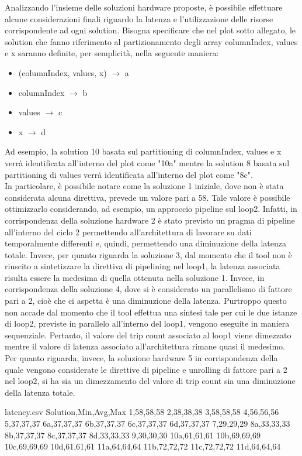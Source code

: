 Analizzando l'insieme delle soluzioni hardware proposte, è possibile effettuare alcune considerazioni finali riguardo la latenza e l'utilizzazione delle risorse corrispondente ad ogni solution. Bisogna specificare che nel plot sotto allegato, le solution che fanno riferimento al partizionamento degli array columnIndex, values e x saranno definite, per semplicità, nella seguente maniera:
\begin{itemize}
	\item (columnIndex, values, x) $\rightarrow$ a
	\item columnIndex $\rightarrow$ b
	\item values $\rightarrow$ c
	\item x $\rightarrow$ d
\end{itemize} 
Ad esempio, la solution 10 basata sul partitioning di columnIndex, values e x verrà identificata all'interno del plot come "10a" mentre la solution 8 basata sul partitioning di values verrà identificata all'interno del plot come "8c".
\\
In particolare, è possibile notare come la soluzione 1 iniziale, dove non è stata considerata alcuna direttiva, prevede un valore pari a 58. Tale valore è possibile ottimizzarlo considerando, ad esempio, un approccio pipeline sul loop2. Infatti, in corrispondenza della soluzione hardware 2 è stato previsto un pragma di pipeline all'interno del ciclo 2 permettendo all'architettura di lavorare su dati temporalmente differenti e, quindi, permettendo una diminuzione della latenza totale. Invece, per quanto riguarda la soluzione 3, dal momento che il tool non è riuscito a sintetizzare la direttiva di pipelining nel loop1, la latenza associata risulta essere la medesima di quella ottenuta nella soluzione 1. Invece, in corrispondenza della soluzione 4, dove si è considerato un parallelismo di fattore pari a 2, cioè che ci aspetta è una diminuzione della latenza. Purtroppo questo non accade dal momento che il tool effettua una sintesi tale per cui le due istanze di loop2, previste in parallelo all'interno del loop1, vengono eseguite in maniera sequenziale. Pertanto, il valore del trip count associato al loop1 viene dimezzato mentre il valore di latenza associato all'architettura rimane quasi il medesimo. Per quanto riguarda, invece, la soluzione hardware 5 in corrispondenza della quale vengono considerate le direttive di pipeline e unrolling di fattore pari a 2 nel loop2, si ha sia un dimezzamento del valore di trip count sia una diminuzione della latenza totale.

\begin{filecontents*}{latency.csv}
	Solution,Min,Avg,Max
	1,58,58,58
	2,38,38,38
	3,58,58,58
	4,56,56,56
	5,37,37,37
	6a,37,37,37
	6b,37,37,37
	6c,37,37,37
	6d,37,37,37
	7,29,29,29
	8a,33,33,33
	8b,37,37,37
	8c,37,37,37
	8d,33,33,33
	9,30,30,30
	10a,61,61,61
	10b,69,69,69
	10c,69,69,69
	10d,61,61,61
	11a,64,64,64
	11b,72,72,72
	11c,72,72,72
	11d,64,64,64
\end{filecontents*}

